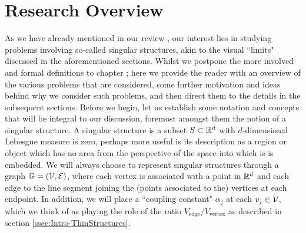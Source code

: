 \section{Research Overview} \label{sec:Intro-ProblemIntroduction}


As we have already mentioned in our review , our interest lies in studying problems involving so-called singular structures, akin to the visual ``limits" discussed in the aforementioned sections.
Whilst we postpone the more involved and formal definitions to chapter ; here we provide the reader with an overview of the various problems that are considered, some further motivation and ideas behind why we consider such problems, and then direct them to the details in the subsequent sections.
Before we begin, let us establish some notation and concepts that will be integral to our discussion, foremost amongst them the notion of a singular structure.
A singular structure is a subset $S\subset\mathbb{R}^d$ with $d$-dimensional Lebesgue measure is zero, perhaps more useful is its description as a region or object which has no area from the perspective of the space into which is is embedded.
We will always choose to represent singular structures through a graph $\mathbb{G}=\left( \mathcal{V},\mathcal{E} \right)$, where each vertex is associated with a point in $\mathbb{R}^d$ and each edge to the line segment joining the (points associated to the) vertices at each endpoint.
In addition, we will place a ``coupling constant" $\alpha_j$ at each $v_j\in\mathcal{V}$, which we think of as playing the role of the ratio $V_{\mathrm{edge}} / V_{\mathrm{vertex}}$ as described in section \ref{ssec:Intro-ThinStructures}.

